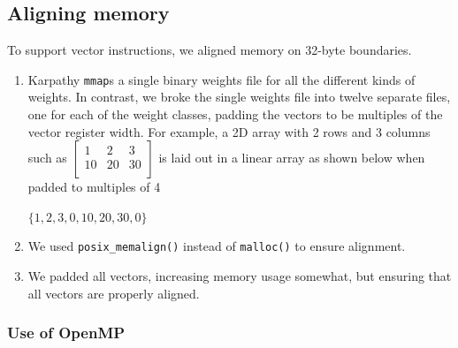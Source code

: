 \documentclass[letterpaper,12pt]{article}
\newcommand{\be}{\begin{enumerate}}
\newcommand{\ee}{\end{enumerate}}
\begin{document}
\subsection{Aligning memory}

To support vector instructions, we aligned memory on 32-byte boundaries.
\be
\item Karpathy {\tt mmap}s a single binary weights file for all the different
  kinds of weights. In contrast, we broke the single weights file into twelve separate files, 
one for each of the weight classes, padding the vectors to be multiples of the
vector register width. For example, a 2D array with 2 rows and 3 columns such as 
\(
\begin{bmatrix}
  1 & 2 & 3 \\ 
  10 & 20 & 30 \\ 
\end{bmatrix}
\)
is laid out in a linear array as shown below when padded to multiples of 4 
\begin{center}
\(\{1, 2, 3, 0, 10, 20, 30, 0\}\)
\end{center}
\item We used {\tt posix\_memalign()} instead of
{\tt malloc()} to ensure alignment. 
\item We padded all vectors, increasing memory usage somewhat, but ensuring that
  all vectors are properly aligned.
\ee


\subsubsection{Use of OpenMP}

\end{document}
